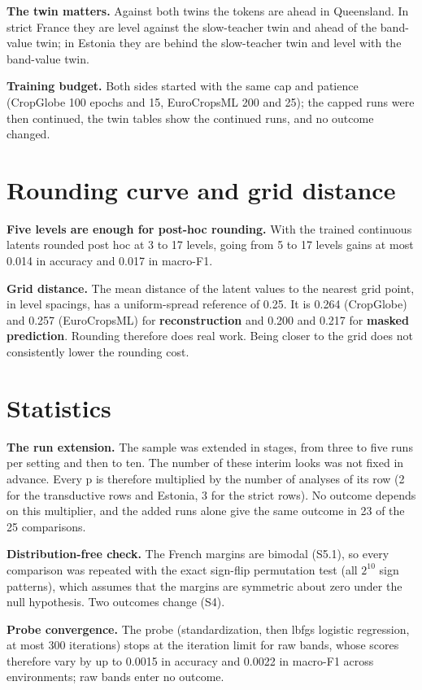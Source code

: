 \documentclass[10pt]{article}
\begin{document}
\textbf{The twin matters.} Against both twins the tokens are ahead in Queensland. In strict France they are level against the slow-teacher twin and ahead of the band-value twin; in Estonia they are behind the slow-teacher twin and level with the band-value twin.

\textbf{Training budget.} Both sides started with the same cap and patience (CropGlobe 100 epochs and 15, EuroCropsML 200 and 25); the capped runs were then continued, the twin tables show the continued runs, and no outcome changed.

\section{Rounding curve and grid distance}

\textbf{Five levels are enough for post-hoc rounding.} With the trained continuous latents rounded post hoc at 3 to 17 levels, going from 5 to 17 levels gains at most 0.014 in accuracy and 0.017 in macro-F1.

\textbf{Grid distance.} The mean distance of the latent values to the nearest grid point, in level spacings, has a uniform-spread reference of 0.25. It is 0.264 (CropGlobe) and 0.257 (EuroCropsML) for \textbf{reconstruction} and 0.200 and 0.217 for \textbf{masked prediction}. Rounding therefore does real work. Being closer to the grid does not consistently lower the rounding cost.

\section{Statistics}

\textbf{The run extension.} The sample was extended in stages, from three to five runs per setting and then to ten. The number of these interim looks was not fixed in advance. Every p is therefore multiplied by the number of analyses of its row (2 for the transductive rows and Estonia, 3 for the strict rows). No outcome depends on this multiplier, and the added runs alone give the same outcome in 23 of the 25 comparisons.

\textbf{Distribution-free check.} The French margins are bimodal (S5.1), so every comparison was repeated with the exact sign-flip permutation test (all $2^{10}$ sign patterns), which assumes that the margins are symmetric about zero under the null hypothesis. Two outcomes change (S4).

\textbf{Probe convergence.} The probe (standardization, then lbfgs logistic regression, at most 300 iterations) stops at the iteration limit for raw bands, whose scores therefore vary by up to 0.0015 in accuracy and 0.0022 in macro-F1 across environments; raw bands enter no outcome.
\end{document}
